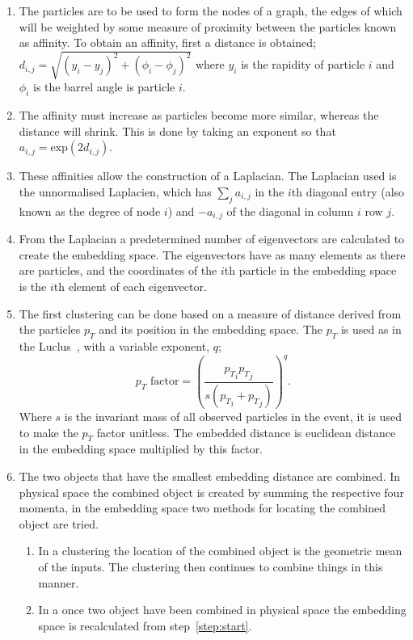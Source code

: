 \begin{enumerate}
    \item \label{step:start} The particles are to be used to form the nodes of a graph,
    the edges of which will be weighted by some measure of proximity between the particles known as affinity.
    To obtain an affinity, first a distance is obtained; \(d_{i,j} = \sqrt{(y_i - y_j)^2 + (\phi_i - \phi_j)^2}\)
    where \(y_i\) is the rapidity of particle \(i\) and \(\phi_i\) is the barrel angle is particle \(i\).

    \item The affinity must increase as particles become more similar, whereas the distance will shrink.
        This is done by taking an exponent so that \(a_{i,j} = \text{exp}(2d_{i,j})\).%

    \item These affinities allow the construction of a Laplacian.
    The Laplacian used is the unnormalised Laplacien, which has \(\sum_j a_{i,j}\) in the \(i\)th
    diagonal entry (also known as the degree of node \(i\)) and \(-a_{i,j}\) of the diagonal 
    in column \(i\) row \(j\).

    \item From the Laplacian a predetermined number of eigenvectors are calculated to create the embedding space.
    The eigenvectors have as many elements as there are particles, and the coordinates of
    the \(i\)th particle in the embedding space is the \(i\)th element of each eigenvector.

    \item The first clustering can be done based on 
    a measure of distance derived from the particles \(p_T\) and its position in the embedding space.
    The \(p_T\) is used as in the Luclus~\cite{moretti1998new}, with a variable exponent, \(q\);
    \[p_T \text{ factor} = \left(\frac{{p_T}_i{p_T}_j}{s({p_T}_i+{p_T}_j)}\right)^q.\]
    Where \(s\) is the invariant mass of all observed particles in the event, it is used
    to make the \(p_T\) factor unitless.
    The embedded distance is euclidean distance in the embedding space multiplied by this factor.

    \item The two objects that have the smallest embedding distance are combined.
    In physical space the combined object is created by summing the respective four momenta,
    in the embedding space two methods for locating the combined object are tried.
    \begin{enumerate}
        \item In a \spectralmeanjet{} clustering the location of the combined object is the
        geometric mean of the inputs. The clustering then continues to combine things in this manner.
        \item In a \spectralfulljet{} once two object have been combined in physical space
            the embedding space is recalculated from step~\ref{step:start}. 
    \end{enumerate}


\end{enumerate}
